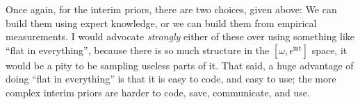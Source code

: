 \documentclass[12pt]{article}
\newcommand{\ellip}{\epsilon}
\newcommand{\intrinsic}{\ellip^{\mathrm{int}}}
\newcommand{\nspars}{\omega}
\begin{document}
Once again, for the interim priors, there are two choices, given above:
We can build them using expert knowledge,
  or we can build them from empirical measurements.
I would advocate \emph{strongly} either of these over using something like ``flat in everything'',
  because there is so much structure in the $[\nspars, \intrinsic]$ space,
  it would be a pity to be sampling useless parts of it.
That said, a huge advantage of doing ``flat in everything'' is that it is easy to code,
  and easy to use;
  the more complex interim priors are harder to code, save, communicate, and use.
\end{document}
